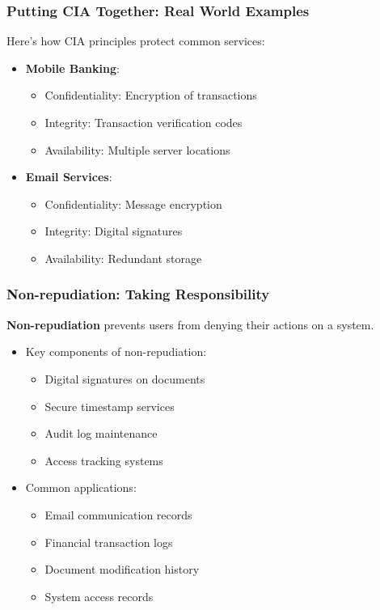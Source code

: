 \documentclass{beamer}
\begin{document}
\begin{frame}
    \frametitle{Putting CIA Together: Real World Examples}
    Here's how CIA principles protect common services:
    \begin{itemize}
        \item \textbf{Mobile Banking}:
          \begin{itemize}
            \item Confidentiality: Encryption of transactions
            \item Integrity: Transaction verification codes
            \item Availability: Multiple server locations
          \end{itemize}
        \item \textbf{Email Services}:
          \begin{itemize}
            \item Confidentiality: Message encryption
            \item Integrity: Digital signatures
            \item Availability: Redundant storage
          \end{itemize}
    \end{itemize}
\end{frame}

\begin{frame}
    \frametitle{Non-repudiation: Taking Responsibility}
    \textbf{Non-repudiation} prevents users from denying their actions on a system.
    \begin{itemize}
        \item Key components of non-repudiation:
          \begin{itemize}
            \item Digital signatures on documents
            \item Secure timestamp services
            \item Audit log maintenance
            \item Access tracking systems
          \end{itemize}
        \item Common applications:
          \begin{itemize}
            \item Email communication records
            \item Financial transaction logs
            \item Document modification history
            \item System access records
          \end{itemize}
    \end{itemize}
\end{frame}
\end{document}

